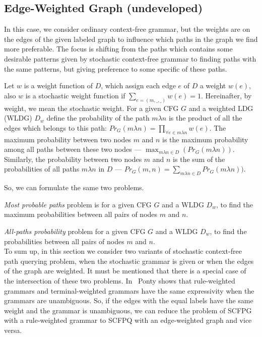 \documentclass[sigconf, 10pt]{acmart}
\begin{document}
\subsection{Edge-Weighted Graph {\color{red}(undeveloped)}}

In this case, we consider ordinary context-free grammar, but the weights are on the edges of the given labeled graph to influence which paths in the graph we find more preferable.
The focus is shifting from the paths which contains some desirable patterns given by stochastic context-free grammar to finding paths with the same patterns, but giving preference to some specific of these paths.

Let $w$ is a weight function of $D$, which assign each edge $e$ of $D$ a weight $w(e)$, also $w$ is a stochastic weight function if $\sum_{e = (m, \_, \_)} w(e) = 1$. Hereinafter, by weight, we mean the stochastic weight.
For a given CFG $G$ and a weighted LDG (WLDG) $D_w$ define the probability of the path $m\lambda n$ is the product of all the edges which belongs to this path: $Pr_{G}(m\lambda n) = \prod_{\forall e \in m\lambda n} w(e)$. 
The maximum probability between two nodes $m$ and $n$ is the maximum probability among all paths between these two nodes --- $ \max_{m \lambda n \in D} (Pr_{G}(m\lambda n))$.
Similarly, the probability between two nodes $m$ and $n$ is the sum of the probabilities of all paths $m \lambda n$ in $D$ --- $Pr_{G}(m, n) = \sum_{m \lambda n \in D} Pr_{G}(m\lambda n))$.

So, we can formulate the same two problems.

\emph{Most probable paths} problem is for a given CFG $G$ and a WLDG $D_w$, to find the maximum probabilities between all pairs of nodes $m$ and $n$. 

\emph{All-paths probability} problem for a given CFG $G$ and a WLDG $D_w$, to find the probabilities between all pairs of nodes $m$ and $n$. \\

To sum up, in this section we consider two variants of stochastic context-free path querying problem, when the stochastic grammar is given or when the edges of the graph are weighted. 
It must be mentioned that there is a special case of the intersection of these two problems. In~\cite{ponty2012rule} Ponty shows that rule-weighted grammars and terminal-weighted grammars have the same expressivity when the grammars are unambiguous. 
So, if the edges with the equal labels have the same weight and the grammar is unambiguous, we can reduce the problem of SCFPG with a rule-weighted grammar to SCFPQ with an edge-weighted graph and vice versa.
\end{document}
